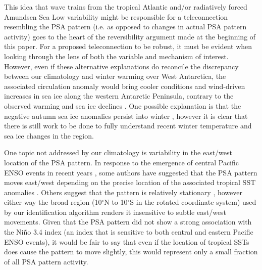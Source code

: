 This idea that wave trains from the tropical Atlantic and/or radiatively forced Amundsen Sea Low variability might be responsible for a teleconnection resembling the PSA pattern (i.e. as opposed to changes in actual PSA pattern activity) goes to the heart of the reversibility argument made at the beginning of this paper. For a proposed teleconnection to be robust, it must be evident when looking through the lens of both the variable and mechanism of interest. However, even if these alternative explanations do reconcile the discrepancy between our climatology and winter warming over West Antarctica, the associated circulation anomaly would bring cooler conditions and wind-driven increases in sea ice along the western Antarctic Peninsula, contrary to the observed warming and sea ice declines \citep{Clem2015}. One possible explanation is that the negative autumn sea ice anomalies persist into winter \citep{Ding2013}, however it is clear that there is still work to be done to fully understand recent winter temperature and sea ice changes in the region.

One topic not addressed by our climatology is variability in the east/west location of the PSA pattern. In response to the emergence of central Pacific ENSO events in recent years \citep[e.g.][]{Ashok2007}, some authors have suggested that the PSA pattern moves east/west depending on the precise location of the associated tropical SST anomalies \citep[e.g.][]{Sun2013,Wilson2014,Ciasto2015}. Others suggest that the pattern is relatively stationary \citep[e.g.][]{Liu2007,Ding2012}, however either way the broad region (10$^{\circ}$N to 10$^{\circ}$S in the rotated coordinate system) used by our identification algorithm renders it insensitive to subtle east/west movements. Given that the PSA pattern did not show a strong association with the Ni\~{n}o 3.4 index (an index that is sensitive to both central and eastern Pacific ENSO events), it would be fair to say that even if the location of tropical SSTs does cause the pattern to move slightly, this would represent only a small fraction of all PSA pattern activity. 

